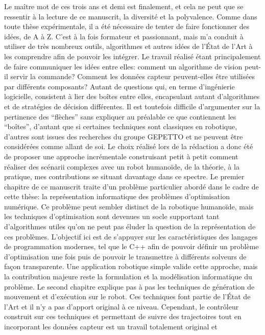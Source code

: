 Le maître mot de ces trois ans et demi est finalement, et cela ne peut
que se ressentir à la lecture de ce manuscrit, la diversité et la
polyvalence. Comme dans toute thèse expérimentale, il a été nécessaire
de tenter de faire fonctionner des idées, de A à Z. C'est à la fois
formateur et passionnant, mais m'a conduit à utiliser de très nombreux
outils, algorithmes et autres idées de l'État de l'Art à les
comprendre afin de pouvoir les intégrer. Le travail réalisé étant
principalement de faire communiquer les idées entre elles: comment un
algorithme de vision peut-il servir la commande? Comment les données
capteur peuvent-elles être utilisées par différents composants?
Autant de questions qui, en terme d'ingénierie logicielle, consistent
à lier des boîtes entre elles, encapsulant autant d'algorithmes et de
stratégies de décision différentes. Il est toutefois difficile
d'argumenter sur la pertinence des ``flèches'' sans expliquer au
préalable ce que contiennent les ``boîtes'', d'autant que si certaines
techniques sont classiques en robotique, d'autres sont issues des
recherches du groupe GEPETTO et ne peuvent être considérées comme
allant de soi. Le choix réalisé lors de la rédaction a donc été de
proposer une approche incrémentale construisant petit à petit comment
réaliser des scénarii complexes avec un robot humanoïde, de la
théorie, à la pratique, mes contributions se situant davantage dans ce
spectre. Le premier chapitre de ce manuscrit traite d'un problème
particulier abordé dans le cadre de cette thèse: la représentation
informatique des problèmes d'optimisation numérique. Ce problème peut
sembler distinct de la robotique humanoïde, mais les techniques
d'optimisation sont devenues un socle supportant tant d'algorithmes
utiles qu'on ne peut pas éluder la question de la représentation de
ces problèmes. L'objectif ici est de s'appuyer sur les
caractéristiques des langages de programmation modernes, tel que le
C++ afin de pouvoir définir un problème d'optimisation une fois puis
de pouvoir le transmettre à différents solveurs de façon
transparente. Une application robotique simple valide cette approche,
mais la contribution majeure reste la formulation et la modélisation
informatique du problème. Le second chapitre explique pas à pas les
techniques de génération de mouvement et d'exécution sur le robot. Ces
techniques font partie de l'État de l'Art et il n'y a pas d'apport
original à ce niveau. Cependant, le contrôleur construit sur ces
techniques et permettant de suivre des trajectoires tout en
incorporant les données capteur est un travail totalement original et
